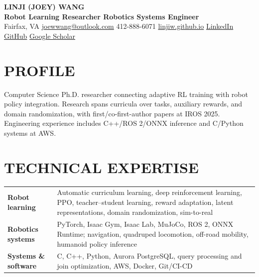 \documentclass[letterpaper,10pt]{article}
\begin{document}
\begin{center}
  {\fontsize{19}{21}\selectfont\bfseries LINJI (JOEY) WANG}\\[-1pt]
  {\large\bfseries\color{accent}Robot Learning Researcher \textbar{} Robotics Systems Engineer}\\[2pt]
  \small Fairfax, VA \textbar{}
  \href{mailto:joewwang@outlook.com}{joewwang@outlook.com} \textbar{}
  412-888-6071 \textbar{}
  \href{https://linjiw.github.io}{linjiw.github.io} \textbar{}
  \href{https://www.linkedin.com/in/linjiw}{LinkedIn} \textbar{}
  \href{https://github.com/linjiw}{GitHub} \textbar{}
  \href{https://scholar.google.com/citations?user=VURUgFMAAAAJ}{Google Scholar}
\end{center}
\vspace{-7pt}

\section{PROFILE}
\small Computer Science Ph.D. researcher connecting adaptive RL training with robot policy integration. Research spans curricula over tasks, auxiliary rewards, and domain randomization, with first/co-first-author papers at IROS 2025. Engineering experience includes C++/ROS 2/ONNX inference and C/Python systems at AWS.

\section{TECHNICAL EXPERTISE}
\small
\begin{tabularx}{\textwidth}{>{\bfseries}p{1.36in} X}
Robot learning & Automatic curriculum learning, deep reinforcement learning, PPO, teacher--student learning, reward adaptation, latent representations, domain randomization, sim-to-real \\
Robotics systems & PyTorch, Isaac Gym, Isaac Lab, MuJoCo, ROS 2, ONNX Runtime; navigation, quadruped locomotion, off-road mobility, humanoid policy inference \\
Systems \& software & C, C++, Python, Aurora PostgreSQL, query processing and join optimization, AWS, Docker, Git/CI-CD \\
\end{tabularx}
\end{document}
